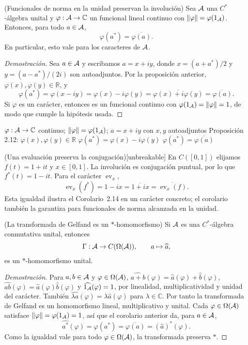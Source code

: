 \begin{cthcorolario}{(Funcionales de norma en la unidad preservan la involución)}
Sea $\mathcal A$ una $C^*$-álgebra unital y $\varphi:\mathcal A\to\mathbb C$ un funcional lineal
continuo con $\|\varphi\|=\varphi(1_\mathcal A)$. Entonces, para todo $a\in\mathcal A$,
\[
 \varphi(a^*)=\overline{\varphi(a)}.
\]
En particular, esto vale para los caracteres de $\mathcal A$.
\end{cthcorolario}

\begin{proof}[Demostración]
Sea $a\in\mathcal A$ y escribamos $a=x+iy$, donde
$x=(a+a^*)/2$ y $y=(a-a^*)/(2i)$ son autoadjuntos. Por la proposición
anterior, $\varphi(x),\varphi(y)\in\mathbb R$, y
\[
 \varphi(a^*)=\varphi(x-iy)=\varphi(x)-i\varphi(y)
 =\overline{\varphi(x)+i\varphi(y)}=\overline{\varphi(a)}.
\]
Si $\varphi$ es un carácter, entonces es un funcional continuo con
$\varphi(1_\mathcal A)=\|\varphi\|=1$, de modo que cumple la hipótesis usada.
\end{proof}

\proofdiagram
{$\varphi:\mathcal A\to\mathbb C$ continuo; $\|\varphi\|=\varphi(1_\mathcal A)$; $a=x+iy$ con $x,y$ autoadjuntos}
{Proposición 2.12: $\varphi(x),\varphi(y)\in\mathbb R$}
{$\varphi(a^*)=\varphi(x)-i\varphi(y)$}
{$\varphi(a^*)=\overline{\varphi(a)}$}

\begin{cthejemplo}{(Una evaluación preserva la conjugación)}[unbreakable]
En $C([0,1])$ elijamos $f(t)=1+it$ y $x\in[0,1]$.
La involución es conjugación puntual, por lo que
$f^*(t)=1-it$. Para el carácter $\operatorname{ev}_x$,
\[
 \operatorname{ev}_x(f^*)=1-ix
 =\overline{1+ix}
 =\overline{\operatorname{ev}_x(f)}.
\]
Esta igualdad ilustra el Corolario~2.14 en un carácter concreto; el corolario
también la garantiza para funcionales de norma alcanzada en la unidad.
\end{cthejemplo}

\begin{cthcorolario}{(La transformada de Gelfand es un $*$-homomorfismo)}
Si $\mathcal A$ es una $C^*$-álgebra conmutativa unital, entonces
\[
 \Gamma:\mathcal A\to C(\Omega(\mathcal A)),\qquad a\mapsto\widehat a,
\]
es un $*$-homomorfismo unital.
\end{cthcorolario}

\begin{proof}[Demostración]
Para $a,b\in\mathcal A$ y $\varphi\in\Omega(\mathcal A)$,
$\widehat{a+b}(\varphi)=\widehat a(\varphi)+\widehat b(\varphi)$,
$\widehat{ab}(\varphi)=\widehat a(\varphi)\widehat b(\varphi)$ y
$\widehat{1_\mathcal A}(\varphi)=1$, por linealidad, multiplicatividad y unidad del
carácter. También $\widehat{\lambda a}(\varphi)=\lambda\widehat a(\varphi)$
para $\lambda\in\mathbb C$. Por tanto la transformada de Gelfand es un
homomorfismo lineal, multiplicativo y unital. Cada
$\varphi\in\Omega(\mathcal A)$ satisface $\|\varphi\|=\varphi(1_\mathcal A)=1$, así que el corolario
anterior da, para $a\in\mathcal A$,
\[
 \widehat{a^*}(\varphi)=\varphi(a^*)
 =\overline{\varphi(a)}=(\widehat a)^*(\varphi).
\]
Como la igualdad vale para todo $\varphi\in\Omega(\mathcal A)$, la transformada preserva $*$.
\end{proof}

